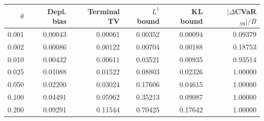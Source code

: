 \begin{tabular}{rrrrrr}
\toprule
$\theta$ & Depl. bias & Terminal TV & $L^1$ bound & KL bound & $|\Delta$CVaR$_{.99}|/B$ \\
\midrule
0.001 & 0.00043 & 0.00061 & 0.00352 & 0.00094 & 0.09379 \\
0.002 & 0.00086 & 0.00122 & 0.00704 & 0.00188 & 0.18753 \\
0.010 & 0.00432 & 0.00611 & 0.03521 & 0.00935 & 0.93514 \\
0.025 & 0.01088 & 0.01522 & 0.08803 & 0.02326 & 1.00000 \\
0.050 & 0.02200 & 0.03024 & 0.17606 & 0.04615 & 1.00000 \\
0.100 & 0.04491 & 0.05962 & 0.35213 & 0.09087 & 1.00000 \\
0.200 & 0.09291 & 0.11544 & 0.70425 & 0.17642 & 1.00000 \\
\bottomrule
\end{tabular}
